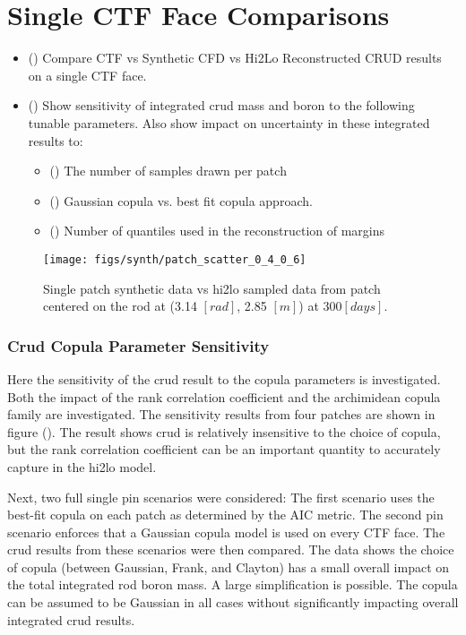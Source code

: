 \section{Single CTF Face Comparisons}
\begin{itemize}
    \item (\checkmark) Compare CTF vs Synthetic CFD vs Hi2Lo Reconstructed CRUD results on a single CTF face.
    \item (\checkmark) Show sensitivity of integrated crud mass and boron to the following tunable parameters.  Also show impact on uncertainty in these integrated results to:
    \begin{itemize}
        \item (\checkmark) The number of samples drawn per patch
        \item (\checkmark) Gaussian copula vs. best fit copula approach.
        \item (\checkmark) Number of quantiles used in the reconstruction of margins
    \end{itemize}
\end{itemize}

\begin{figure}[H]
    \centering
    \texttt{[image: figs/synth/patch\_scatter\_0\_4\_0\_6]}
    \caption[Single patch synthetic CFD data vs hi2lo sampled data.]{Single patch synthetic data vs hi2lo sampled data from patch centered on the rod at (3.14 $[rad]$, 2.85 $[m]$) at 300$[days]$.}
    \label{fig:patchscatter}
\end{figure}

\subsubsection{Crud Copula Parameter Sensitivity}

Here the sensitivity of the crud result to the copula parameters is investigated.  Both the impact of the rank correlation coefficient and the archimidean copula family are investigated.  The sensitivity results from four patches are shown in figure ().  The result shows crud is relatively insensitive to the choice of copula, but the rank correlation coefficient can be an important quantity to accurately capture in the hi2lo model.  

Next, two full single pin scenarios were considered:  The first scenario uses the best-fit copula on each patch as determined by the AIC metric.  The second pin scenario enforces that a Gaussian copula model is used on every CTF face.  The crud results from these scenarios were then compared.  The data shows the choice of copula (between Gaussian, Frank, and Clayton) has a small overall impact on the total integrated rod boron mass.  A large simplification is possible.  The copula can be assumed to be Gaussian in all cases without significantly impacting overall integrated crud results.

